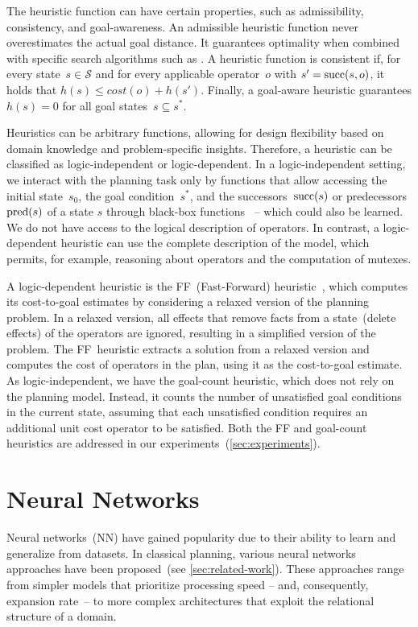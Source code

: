 The heuristic function can have certain properties, such as admissibility, consistency, and goal-awareness. An admissible heuristic function never overestimates the actual goal distance. It guarantees optimality when combined with specific search algorithms such as \astar. A heuristic function is consistent if, for every state~$s \in \mathcal{S}$ and for every applicable operator~$o$ with $s' = \operatorname{succ}(s,o)$, it holds that $h(s) \leq cost(o) + h(s')$. Finally, a goal-aware heuristic guarantees $h(s) = 0$ for all goal states~$s \subseteq s^*$.

Heuristics can be arbitrary functions, allowing for design flexibility based on domain knowledge and problem-specific insights. Therefore, a heuristic can be classified as logic-independent or logic-dependent. In a logic-independent setting, we interact with the planning task only by functions that allow accessing the initial state~$s_0$, the goal condition~$s^*$, and the successors~$\operatorname{succ}(s)$ or predecessors~$\operatorname{pred}(s)$ of a state $s$ through black-box functions~\cite{sturtevant2019exponential} -- which could also be learned. We do not have access to the logical description of operators. In contrast, a logic-dependent heuristic can use the complete description of the model, which permits, for example, reasoning about operators and the computation of mutexes.

A logic-dependent heuristic is the FF~(Fast-Forward) heuristic~\cite{hoffmann2001ff}, which computes its cost-to-goal estimates by considering a relaxed version of the planning problem. In a relaxed version, all effects that remove facts from a state~(delete effects) of the operators are ignored, resulting in a simplified version of the problem. The FF~heuristic extracts a solution from a relaxed version and computes the cost of operators in the plan, using it as the cost-to-goal estimate. As logic-independent, we have the goal-count heuristic, which does not rely on the planning model. Instead, it counts the number of unsatisfied goal conditions in the current state, assuming that each unsatisfied condition requires an additional unit cost operator to be satisfied. Both the FF and goal-count heuristics are addressed in our experiments~(\cref{sec:experiments}).

\section{Neural Networks}
\label{sec:neural-networks}

Neural networks~(NN) have gained popularity due to their ability to learn and generalize from datasets. In classical planning, various neural networks approaches have been proposed~(see \cref{sec:related-work}). These approaches range from simpler models that prioritize processing speed -- and, consequently, expansion rate~-- to more complex architectures that exploit the relational structure of a domain.

